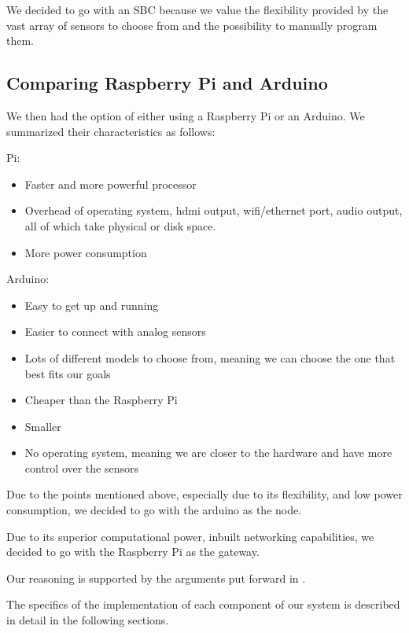 		We decided to go with an SBC because we value the flexibility provided by the vast array of sensors to choose from and the possibility to manually program them.



	\subsection{Comparing Raspberry Pi and Arduino}

		We then had the option of either using a Raspberry Pi or an Arduino. We summarized their characteristics as follows:

		Pi:
		\begin{itemize}
			\item Faster and more powerful processor
			\item Overhead of operating system, hdmi output, wifi/ethernet port, audio output, all of which take physical or disk space.
			\item More power consumption
		\end{itemize}

		Arduino:
		\begin{itemize}
			\item Easy to get up and running
			\item Easier to connect with analog sensors
			\item Lots of different models to choose from, meaning we can choose the one that best fits our goals
			\item Cheaper than the Raspberry Pi
			\item Smaller 
			\item No operating system, meaning we are closer to the hardware and have more control over the sensors
		\end{itemize}

		Due to the points mentioned above, especially due to its flexibility, and low power consumption, we decided to go with the arduino as the node.

		Due to its superior computational power, inbuilt networking capabilities, we decided to go with the Raspberry Pi as the gateway.

		Our reasoning is supported by the arguments put forward in \cite{postolache2011smart}.





The specifics of the implementation of each component of our system is described in detail in the following sections.


